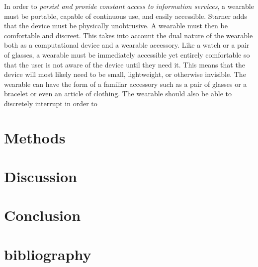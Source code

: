\documentclass[11pt]{article}
\newcommand{\myreferences}{references}
\begin{document}
In order to \textit{persist and provide constant access to information services}, a wearable must be portable, capable of continuous use, and easily accessible. Starner adds that the device must be physically unobtrusive. A wearable must then be comfortable and discreet. This takes into account the dual nature of the wearable both as a computational device and a wearable accessory. Like a watch or a pair of glasses, a wearable must be immediately accessible yet entirely comfortable so that the user is not aware of the device until they need it.  This means that the device will most likely need to be small, lightweight, or otherwise invisible. The wearable can have the form of a familiar accessory such as a pair of glasses or a bracelet or even an article of clothing. The wearable should also be able to discretely interrupt in order to
  
\section{Methods}
\section{Discussion}
\section{Conclusion}
\section{bibliography}


\end{document}
